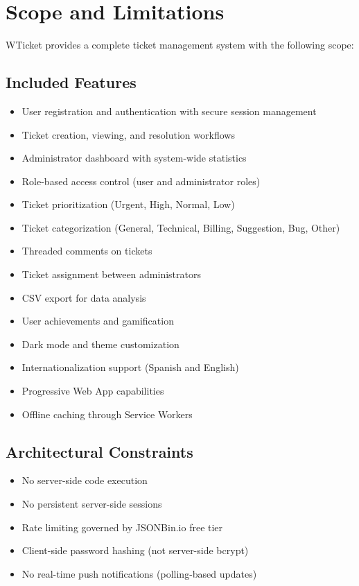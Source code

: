\documentclass[12pt,a4paper]{report}
\begin{document}
\section{Scope and Limitations}
\label{sec:scope}

WTicket provides a complete ticket management system with the following scope:

\subsection{Included Features}
\begin{itemize}
    \item User registration and authentication with secure session management
    \item Ticket creation, viewing, and resolution workflows
    \item Administrator dashboard with system-wide statistics
    \item Role-based access control (user and administrator roles)
    \item Ticket prioritization (Urgent, High, Normal, Low)
    \item Ticket categorization (General, Technical, Billing, Suggestion, Bug, Other)
    \item Threaded comments on tickets
    \item Ticket assignment between administrators
    \item CSV export for data analysis
    \item User achievements and gamification
    \item Dark mode and theme customization
    \item Internationalization support (Spanish and English)
    \item Progressive Web App capabilities
    \item Offline caching through Service Workers
\end{itemize}

\subsection{Architectural Constraints}
\begin{itemize}
    \item No server-side code execution
    \item No persistent server-side sessions
    \item Rate limiting governed by JSONBin.io free tier
    \item Client-side password hashing (not server-side bcrypt)
    \item No real-time push notifications (polling-based updates)
\end{itemize}
\end{document}
